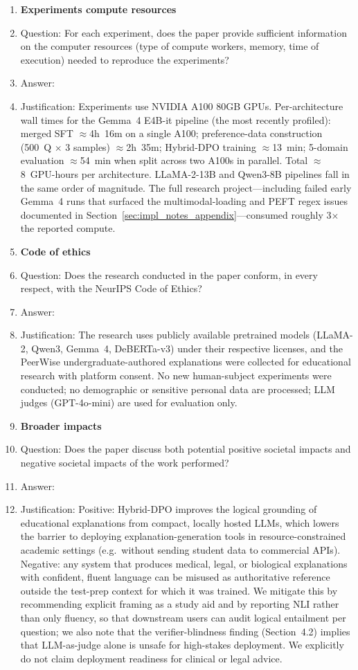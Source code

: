 \begin{enumerate}
\item {\bf Experiments compute resources}
    \item[] Question: For each experiment, does the paper provide sufficient information on the computer resources (type of compute workers, memory, time of execution) needed to reproduce the experiments?
    \item[] Answer: \answerYes{}
    \item[] Justification: Experiments use NVIDIA A100 80GB GPUs. Per-architecture wall times for the Gemma~4 E4B-it pipeline (the most recently profiled): merged SFT $\approx{}$4h~16m on a single A100; preference-data construction (500~Q $\times$ 3 samples) $\approx{}$2h~35m; Hybrid-DPO training $\approx{}$13~min; 5-domain evaluation $\approx{}$54~min when split across two A100s in parallel. Total $\approx{}$8~GPU-hours per architecture. LLaMA-2-13B and Qwen3-8B pipelines fall in the same order of magnitude. The full research project---including failed early Gemma~4 runs that surfaced the multimodal-loading and PEFT regex issues documented in Section~\ref{sec:impl_notes_appendix}---consumed roughly 3$\times$ the reported compute.

\item {\bf Code of ethics}
    \item[] Question: Does the research conducted in the paper conform, in every respect, with the NeurIPS Code of Ethics?
    \item[] Answer: \answerYes{}
    \item[] Justification: The research uses publicly available pretrained models (LLaMA-2, Qwen3, Gemma~4, DeBERTa-v3) under their respective licenses, and the PeerWise undergraduate-authored explanations were collected for educational research with platform consent. No new human-subject experiments were conducted; no demographic or sensitive personal data are processed; LLM judges (GPT-4o-mini) are used for evaluation only.

\item {\bf Broader impacts}
    \item[] Question: Does the paper discuss both potential positive societal impacts and negative societal impacts of the work performed?
    \item[] Answer: \answerYes{}
    \item[] Justification: Positive: Hybrid-DPO improves the logical grounding of educational explanations from compact, locally hosted LLMs, which lowers the barrier to deploying explanation-generation tools in resource-constrained academic settings (e.g.\ without sending student data to commercial APIs). Negative: any system that produces medical, legal, or biological explanations with confident, fluent language can be misused as authoritative reference outside the test-prep context for which it was trained. We mitigate this by recommending explicit framing as a study aid and by reporting NLI rather than only fluency, so that downstream users can audit logical entailment per question; we also note that the verifier-blindness finding (Section~4.2) implies that LLM-as-judge alone is unsafe for high-stakes deployment. We explicitly do not claim deployment readiness for clinical or legal advice.


\end{enumerate}
